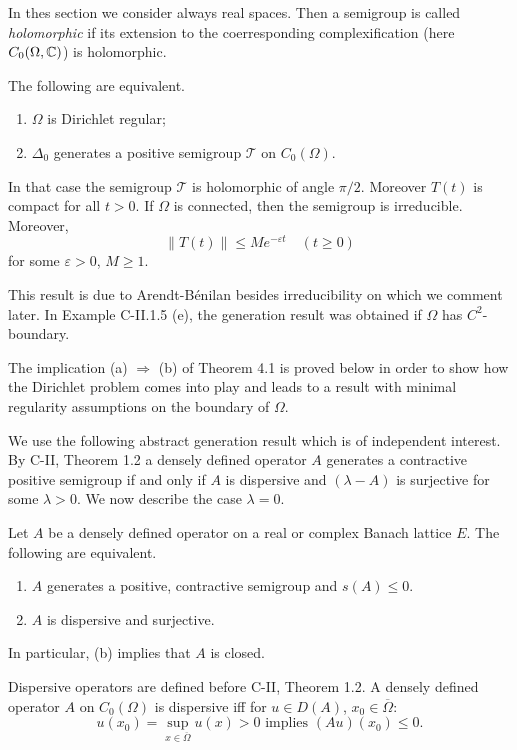 In thes section we consider always real spaces.
Then a semigroup is called \emph{holomorphic} if its extension to the coerresponding complexification (here $ C_{0}( \Omega, \mathbb{C} ) $) is holomorphic.
\begin{theorem} %
The following are equivalent.
\begin{enumerate}[\upshape (a)]

\item 
$\Omega$ is Dirichlet regular;

\item  
$\Delta_0$ generates a positive semigroup $\mathcal{T}$ on $C_0(\Omega)$.

\end{enumerate}
In that case the semigroup $\mathcal{T}$ is holomorphic of angle $\pi/2$. 
Moreover $T(t)$ is compact for all $t > 0$.
If $\Omega$ is connected, then the semigroup is irreducible. 
Moreover,
\begin{equation}
	\|T(t)\| \leq Me^{-\varepsilon t} \quad (t \geq 0)
\end{equation}
for some $\varepsilon > 0$, $M \geq 1$.
\end{theorem}
This result is due to Arendt-Bénilan \cite{ArBe99} besides irreducibility on which we comment later.
In Example C-II.1.5 (e), the generation result was obtained if $\Omega$ has $C^2$-boundary.

The implication (a) $\Rightarrow$ (b) of Theorem 4.1 is proved below in order to show how the Dirichlet problem comes into play and leads to a result with minimal regularity assumptions on the boundary of $\Omega$.

We use the following abstract generation result which is of independent interest. 
By C-II, Theorem 1.2 a densely defined operator $A$ generates a contractive positive semigroup if and only if $A$ is dispersive and $(\lambda - A)$ is surjective for some $\lambda > 0$.
We now describe the case $\lambda = 0$.
\begin{theorem}
Let $A$ be a densely defined operator on a real or complex Banach lattice $E$. 
The following are equivalent.
\begin{enumerate}[\upshape (a)]
\item  
$A$ generates a positive, contractive semigroup and $s(A) \leq 0$.
\item  
$A$ is dispersive and surjective.
\end{enumerate}
In particular, (b) implies that $A$ is closed.
\end{theorem}
Dispersive operators are defined before C-II, Theorem 1.2. A densely defined operator $A$ on $C_0(\Omega)$ is dispersive iff for $u \in D(A)$, $x_0 \in \overline{\Omega}$:
\[u(x_0) = \sup_{x \in \overline{\Omega}} u(x) > 0 \text{ implies } (Au)(x_0) \leq 0.\]


